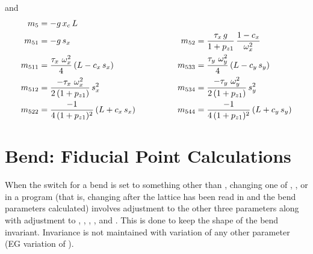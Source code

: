 and
\begin{alignat}{2}
  m_5     &= -g \, x_c \, L & \qquad \qquad & \nonumber \\
  m_{51}  &= -g \, s_x & \qquad \qquad
  m_{52}  &= \frac{\tau_x \, g}{1 + p_{z1}} \, \frac{1 - c_x}{\omega_x^2} \nonumber \\
  m_{511} &= \frac{\tau_x \,\, \omega_x^2}{4} \, (L - c_x \, s_x) & \qquad \qquad
  m_{533} &= \frac{\tau_y \,\, \omega_y^2}{4} \, (L - c_y \, s_y) \nonumber \\
  m_{512} &= \frac{-\tau_x \,\, \omega_x^2}{2 \, (1 + p_{z1})} \, s_x^2 & \qquad \qquad
  m_{534} &= \frac{-\tau_y \,\, \omega_y^2}{2 \, (1 + p_{z1})} \, s_y^2 \nonumber \\
  m_{522} &= \frac{-1}{4 \, (1 + p_{z1})^2} \, (L + c_x \, s_x) & \qquad \qquad
  m_{544} &= \frac{-1}{4 \, (1 + p_{z1})^2} \, (L + c_y \, s_y) \nonumber
\end{alignat}

\section{Bend: Fiducial Point Calculations}
\label{s:bend.fiducial}


When the  switch for a bend is set to something other than , changing one
of , ,  or  in a program (that is, changing after the lattice
has been read in and the bend parameters calculated) involves adjustment to the other three
parameters along with adjustment to , , , , and
. This is done to keep the shape of the bend invariant. Invariance is not maintained
with variation of any other parameter (EG variation of ).

